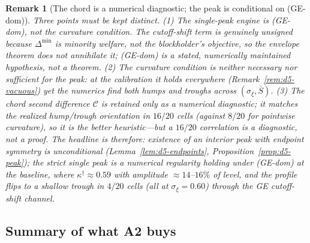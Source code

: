 \documentclass[11pt]{article}
\newcommand{\1}{\mathbf{1}}
\newtheorem{remark}{Remark}
\begin{document}
\begin{remark}[The chord is a numerical diagnostic; the peak is conditional on (GE-dom)]\label{rem:d5-conditional}
Three points must be kept distinct. (1) The single-peak \emph{engine} is (GE-dom), \emph{not} the curvature condition. The cutoff-shift term is genuinely unsigned because $\Delta^{\min}$ is minority welfare, not the blockholder's objective, so the envelope theorem does not annihilate it; (GE-dom) is a stated, numerically maintained hypothesis, not a theorem. (2) The curvature condition is neither necessary nor sufficient for the peak: at the calibration it holds everywhere (Remark~\ref{rem:d5-vacuous}) yet the numerics find both humps and troughs across $(\sigma_\xi,\bar S)$. (3) The chord second difference $\mathcal C$ is retained only as a numerical diagnostic; it matches the realized hump/trough orientation in $16/20$ cells (against $8/20$ for pointwise curvature), so it is the better heuristic---but a $16/20$ correlation is a diagnostic, not a proof. The headline is therefore: \emph{existence} of an interior peak with endpoint symmetry is unconditional (Lemma~\ref{lem:d5-endpoints}, Proposition~\ref{prop:d5-peak}); the \emph{strict single peak} is a numerical regularity holding under (GE-dom) at the baseline, where $\kappa^{\dagger}\approx0.59$ with amplitude $\approx14$--$16\%$ of level, and the profile flips to a shallow trough in $4/20$ cells (all at $\sigma_\xi=0.60$) through the GE cutoff-shift channel.
\end{remark}

\subsection{Summary of what A2 buys}
\label{app:d5-summary}
\end{document}
